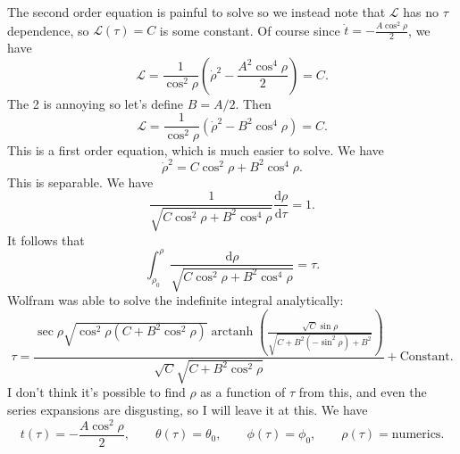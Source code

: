 \documentclass[11pt, letterpaper]{article}
\theoremstyle{plain}
\begin{document}
The second order equation is painful to solve so we instead note that $\mathcal{L} $ has no $\tau $ dependence, so $\mathcal{L} (\tau )=C$ is some constant. Of course since $\dot{t} =-\frac{A \cos ^2\rho }{2} $, we have
\[
	\mathcal{L} =\frac{1}{\cos ^2\rho } \left( \dot{\rho } ^2-\frac{A^2 \cos ^4\rho }{2}  \right) =C
.\]
The 2 is annoying so let's define $B=A/2$. Then
\[
	\mathcal{L} =\frac{1}{\cos ^2\rho } \left( \dot{\rho } ^2-B^2 \cos ^4\rho  \right) =C
.\]
This is a first order equation, which is much easier to solve. We have
\[
	\dot{\rho } ^2=C \cos ^2\rho +B^2 \cos ^4\rho 
.\]
This is separable. We have
\[
	\frac{1}{\sqrt{C \cos ^2\rho +B^2 \cos ^4\rho } } \frac{\mathrm{d}\rho }{\mathrm{d}\tau } =1
.\]
It follows that
\[
	\int_{\rho _0}^{\rho } \frac{\mathrm{d} \rho }{\sqrt{C \cos ^2\rho +B^2 \cos ^4\rho } } =\tau 
.\]
Wolfram was able to solve the indefinite integral analytically:
\[
	\tau =\frac{\sec \rho \sqrt{\cos ^2\rho \left( C+B^2 \cos ^2 \rho  \right) } \operatorname{arctanh} \left( \frac{\sqrt{C} \sin \rho }{\sqrt{C+B^2\left( -\sin ^2\rho  \right) +B^2} }  \right) }{\sqrt{C} \sqrt{C+B^2 \cos ^2\rho } } +\text{Constant} 
.\]
I don't think it's possible to find $\rho $ as a function of $\tau $ from this, and even the series expansions are disgusting, so I will leave it at this. We have
\[
	t(\tau )=-\frac{A \cos ^2\rho }{2} ,\qquad \theta (\tau )=\theta _0,\qquad \phi (\tau )=\phi _0,\qquad \rho (\tau )=\text{numerics} 
.\]
\end{document}
